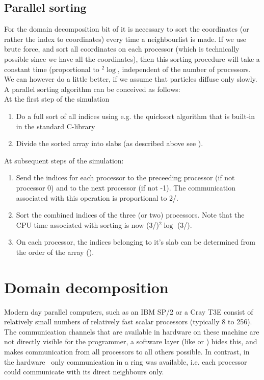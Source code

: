 \subsection{Parallel sorting}
\label{sec:parsort}
For the domain decomposition bit of {\gromacs} it is necessary to sort the 
coordinates (or rather the index to coordinates) every time a neighbourlist is made.
If we use brute force, and sort all coordinates on each processor (which is 
technically possible since we have all the coordinates), then this sorting procedure
will take a constant time (proportional to {\natom}$^2\log${\natom}, 
independent of the number of processors. We can however do a little
better, if we assume that particles diffuse only slowly.
A parallel sorting algorithm can be conceived as follows: \\
At the first step of the simulation
\begin{enumerate}
\item	Do a full sort of all indices using e.g. the  quicksort algorithm that is
	built-in in the standard C-library
\item	Divide the sorted array into slabs (as described above see 
	).
\end{enumerate}
At subsequent steps of the simulation:
\begin{enumerate}
\item	Send the indices for each processor to the preceeding processor (if
	not processor 0) and to the next processor (if not {\nproc}-1). The 
	communication associated with this operation is proportional to
	2{\natom}/{\nproc}.
\item	Sort the combined indices of the three (or two) processors. Note that
	the CPU time associated with sorting is now
	(3{\natom}/{\nproc})$^2\log$ (3{\natom}/{\nproc}).
\item	On each processor, the indices belonging to it's slab can be determined
	from the order of the array ().
\end{enumerate}

\section{Domain decomposition}
Modern day parallel computers, such as an IBM SP/2 or a
Cray T3E consist of relatively
small numbers of relatively fast scalar processors (typically 8 to 256).
The communication channels that are available in hardware on these machine are
not directly visible for the programmer, a software layer (like  or 
) hides this, and makes communication from all processors to all
others possible. In contrast, in the {\gromacs} hardware~\cite{Berendsen95a}
only communication in a ring was available, i.e. each processor could communicate
with its direct neighbours only.

